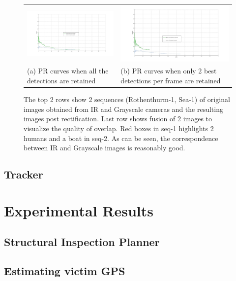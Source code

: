 \documentclass[runningheads]{llncs}
\begin{document}
\begin{figure}
  \centering
  \begin{tabular}{m{5cm}m{5cm}}
  	\includegraphics[width=6cm]{img/fusion/Roth/PR-roth-all-detections.jpg} &
  	\includegraphics[width=6cm]{img/fusion/Roth/PR-roth-top-detections.jpg} \\
  	\small (a) PR curves when all the detections are retained &
  	\small (b) PR curves when only 2 best detections per frame are retained
  \end{tabular}

  \caption{The top 2 rows show 2 sequences (Rothenthurm-1, Sea-1) of original images obtained from IR and Grayscale cameras and the resulting images post rectification. Last row shows fusion of 2 images to visualize the quality of overlap. Red boxes in seq-1 highlights 2 humans and a boat in seq-2. As can be seen, the correspondence between IR and Grayscale images is reasonably good.}\label{fig:fusion}
\end{figure}


\subsection{Tracker}


\section{Experimental Results}

\subsection{Structural Inspection Planner}

\subsection{Estimating victim GPS}
\end{document}
